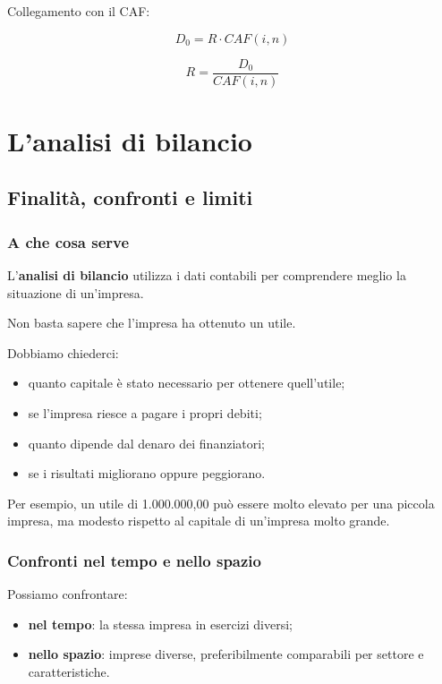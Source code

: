 \noindent Collegamento con il CAF:

\[
\boxed{
D_0=R\cdot CAF(i,n)
}
\]

\[
\boxed{
R=\frac{D_0}{CAF(i,n)}
}
\]


\section{L'analisi di bilancio}

\subsection{Finalità, confronti e limiti}

\subsubsection*{A che cosa serve}

\noindent L'\textbf{analisi di bilancio}
utilizza i dati contabili
per comprendere meglio
la situazione di un'impresa.

\noindent Non basta sapere
che l'impresa ha ottenuto un utile.

\noindent Dobbiamo chiederci:

\begin{itemize}
    \item quanto capitale è stato necessario
    per ottenere quell'utile;

    \item se l'impresa riesce
    a pagare i propri debiti;

    \item quanto dipende
    dal denaro dei finanziatori;

    \item se i risultati migliorano
    oppure peggiorano.
\end{itemize}

\noindent Per esempio,
un utile di 1.000.000,00
può essere molto elevato
per una piccola impresa,
ma modesto rispetto al capitale
di un'impresa molto grande.


\subsubsection*{Confronti nel tempo e nello spazio}

\noindent Possiamo confrontare:

\begin{itemize}
    \item \textbf{nel tempo}:
    la stessa impresa
    in esercizi diversi;

    \item \textbf{nello spazio}:
    imprese diverse,
    preferibilmente comparabili
    per settore e caratteristiche.
\end{itemize}

